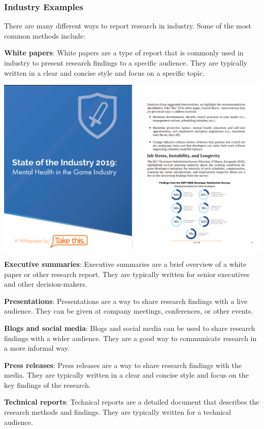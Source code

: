 \documentclass[
]{book}
\begin{document}
\subsubsection*{Industry Examples}\label{industry-examples}

There are many different ways to report research in industry. Some of the most common methods include:

\textbf{White papers}: White papers are a type of report that is commonly used in industry to present research findings to a specific audience. They are typically written in a clear and concise style and focus on a specific topic.

\includegraphics[width=1\linewidth,height=\textheight,keepaspectratio]{images/white_paper.png}

\textbf{Executive summaries}: Executive summaries are a brief overview of a white paper or other research report. They are typically written for senior executives and other decision-makers.

\textbf{Presentations}: Presentations are a way to share research findings with a live audience. They can be given at company meetings, conferences, or other events.

\textbf{Blogs and social media}: Blogs and social media can be used to share research findings with a wider audience. They are a good way to communicate research in a more informal way.

\textbf{Press releases}: Press releases are a way to share research findings with the media. They are typically written in a clear and concise style and focus on the key findings of the research.

\textbf{Technical reports}: Technical reports are a detailed document that describes the research methods and findings. They are typically written for a technical audience.
\end{document}
